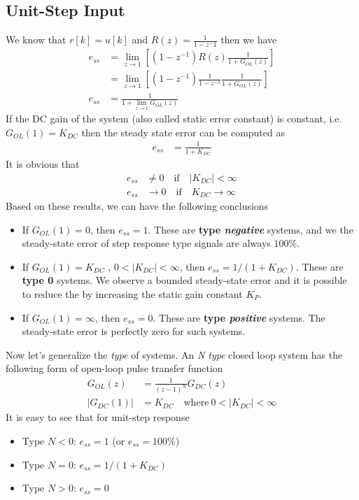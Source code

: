 \documentclass[twoside]{article}
\begin{document}
\subsection*{Unit-Step Input}

We know that $r[k] = u[k]$ and $R(z) = \frac{1}{1 - z^-1}$ then 
we have
%
%
\begin{align*}
e_{ss} &= \lim_{z \to 1} \left[ \left(1 - z^{-1} \right) R(z) \frac{1}{1
         + G_{OL} (z) } \right]
\\
&= \lim_{z \to 1} \left[ \left(1 - z^{-1} \right) \frac{1}{1-z^{-1}} \frac{1}{1
         + G_{OL} (z) } \right]
\\
e_{ss} &= \frac{1}{1 + \lim_{z \to 1} G_{OL} (z) }
\end{align*}
%
If the DC gain of the system (also called static error constant) is
constant, i.e. $G_{OL}(1) = K_{DC}$ then the steady state error can be
computed as
%
\begin{align*}
e_{ss} &= \frac{1}{1 + K_{DC}}
\end{align*}
%
It is obvious that 
%
\begin{align*}
e_{ss} &\neq 0 \quad \mathrm{if} \quad |K_{DC}| < \infty
\\
e_{ss} &\to 0 \quad \mathrm{if} \quad K_{DC} \to \infty
\end{align*}
%
Based on these results, we can have the following conclusions
%
\begin{itemize}
\item If $G_{OL} (1) = 0$, then $e_{ss} = 1$. These are \textbf{type
  \textit{negative}} systems, and we the steady-state error of step 
response type signals are always $100 \%$.
\item If $G_{OL} (1) = K_{DC}$ , $0 < | K_{DC} | < \infty$, then $e_{ss} =
  1/(1 + K_{DC})$. These are \textbf{type 0} systems. We observe a
  bounded steady-state error and it is possible to reduce the by increasing the static gain
constant $K_P$. 
\item  If $G_{OL} (1) = \infty$, then $e_{ss} = 0$. These are
  \textbf{type \textit{positive}} systems. The steady-state error
  is perfectly zero for such systems.
\end{itemize}

Now let's generalize the \textit{type} of systems. An \textit{N type}
closed loop system has the following form of open-loop pulse transfer 
function
%
\begin{align*}
G_{OL}(z) &= \frac{1}{(z-1)^N} G_{DC}(z) \\
| G_{DC}(1) | &= K_{DC} \quad \mathrm{where} \ 0 < | K_{DC} | < \infty
\end{align*}
% 
It is easy to see that for unit-step response
%
\begin{itemize}
\item Type $N < 0$: $e_{ss} = 1$ (or $e_{ss} =100 \%$)
\item Type $N = 0$: $e_{ss} =  1/(1 + K_{DC})$
\item Type $N > 0$: $e_{ss} = 0$
\end{itemize}
\end{document}

